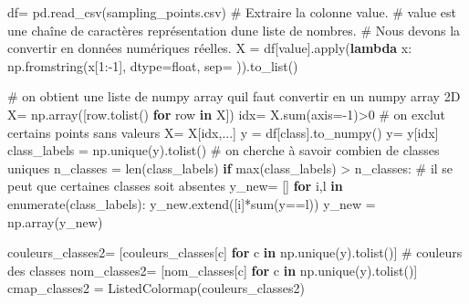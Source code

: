 \documentclass[
  french,
  11pt,
  letterpaper,
  open=any,
  twoside=false,
  french]{scrbook}
\newenvironment{Shaded}{\begin{snugshade}}{\end{snugshade}}
\newcommand{\BuiltInTok}[1]{\textcolor[rgb]{0.00,0.23,0.31}{#1}}
\newcommand{\CommentTok}[1]{\textcolor[rgb]{0.37,0.37,0.37}{#1}}
\newcommand{\ControlFlowTok}[1]{\textcolor[rgb]{0.00,0.23,0.31}{\textbf{#1}}}
\newcommand{\DecValTok}[1]{\textcolor[rgb]{0.68,0.00,0.00}{#1}}
\newcommand{\KeywordTok}[1]{\textcolor[rgb]{0.00,0.23,0.31}{\textbf{#1}}}
\newcommand{\NormalTok}[1]{\textcolor[rgb]{0.00,0.23,0.31}{#1}}
\newcommand{\OperatorTok}[1]{\textcolor[rgb]{0.37,0.37,0.37}{#1}}
\newcommand{\StringTok}[1]{\textcolor[rgb]{0.13,0.47,0.30}{#1}}
\begin{document}
\begin{Shaded}
\begin{Highlighting}[]
\NormalTok{df}\OperatorTok{=}\NormalTok{ pd.read\_csv(}\StringTok{\textquotesingle{}sampling\_points.csv\textquotesingle{}}\NormalTok{)}
\CommentTok{\# Extraire la colonne \textquotesingle{}value\textquotesingle{}.}
\CommentTok{\# \textquotesingle{}value\textquotesingle{} est une chaîne de caractères représentation d\textquotesingle{}une liste de nombres.}
\CommentTok{\# Nous devons la convertir en données numériques réelles.}
\NormalTok{X }\OperatorTok{=}\NormalTok{ df[}\StringTok{\textquotesingle{}value\textquotesingle{}}\NormalTok{].}\BuiltInTok{apply}\NormalTok{(}\KeywordTok{lambda}\NormalTok{ x: np.fromstring(x[}\DecValTok{1}\NormalTok{:}\OperatorTok{{-}}\DecValTok{1}\NormalTok{], dtype}\OperatorTok{=}\BuiltInTok{float}\NormalTok{, sep}\OperatorTok{=}\StringTok{\textquotesingle{} \textquotesingle{}}\NormalTok{)).to\_list()}

\CommentTok{\# on obtient une liste de numpy array  qu\textquotesingle{}il faut convertir en un numpy array 2D}
\NormalTok{X}\OperatorTok{=}\NormalTok{ np.array([row.tolist() }\ControlFlowTok{for}\NormalTok{ row }\KeywordTok{in}\NormalTok{ X])}
\NormalTok{idx}\OperatorTok{=}\NormalTok{ X.}\BuiltInTok{sum}\NormalTok{(axis}\OperatorTok{={-}}\DecValTok{1}\NormalTok{)}\OperatorTok{\textgreater{}}\DecValTok{0} \CommentTok{\# on exclut certains points sans valeurs}
\NormalTok{X}\OperatorTok{=}\NormalTok{ X[idx,...]}
\NormalTok{y }\OperatorTok{=}\NormalTok{ df[}\StringTok{\textquotesingle{}class\textquotesingle{}}\NormalTok{].to\_numpy()}
\NormalTok{y}\OperatorTok{=}\NormalTok{ y[idx]}
\NormalTok{class\_labels }\OperatorTok{=}\NormalTok{ np.unique(y).tolist() }\CommentTok{\# on cherche à savoir combien de classes uniques}
\NormalTok{n\_classes }\OperatorTok{=} \BuiltInTok{len}\NormalTok{(class\_labels)}
\ControlFlowTok{if} \BuiltInTok{max}\NormalTok{(class\_labels) }\OperatorTok{\textgreater{}}\NormalTok{ n\_classes: }\CommentTok{\# il se peut que certaines classes soit absentes}
\NormalTok{  y\_new}\OperatorTok{=}\NormalTok{ []}
  \ControlFlowTok{for}\NormalTok{ i,l }\KeywordTok{in} \BuiltInTok{enumerate}\NormalTok{(class\_labels):}
\NormalTok{    y\_new.extend([i]}\OperatorTok{*}\BuiltInTok{sum}\NormalTok{(y}\OperatorTok{==}\NormalTok{l))}
\NormalTok{  y\_new }\OperatorTok{=}\NormalTok{ np.array(y\_new)}

\NormalTok{couleurs\_classes2}\OperatorTok{=}\NormalTok{ [couleurs\_classes[c] }\ControlFlowTok{for}\NormalTok{ c }\KeywordTok{in}\NormalTok{ np.unique(y).tolist()] }\CommentTok{\# couleurs des classes}
\NormalTok{nom\_classes2}\OperatorTok{=}\NormalTok{ [nom\_classes[c] }\ControlFlowTok{for}\NormalTok{ c }\KeywordTok{in}\NormalTok{ np.unique(y).tolist()]}
\NormalTok{cmap\_classes2 }\OperatorTok{=}\NormalTok{ ListedColormap(couleurs\_classes2)}
\end{Highlighting}
\end{Shaded}
\end{document}
